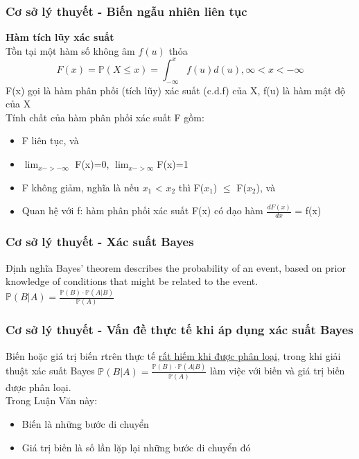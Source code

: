 \documentclass[t]{beamer}
\begin{document}
\begin{frame}[t]
\frametitle{Cơ sở lý thuyết - Biến ngẫu nhiên liên tục}
\textbf{Hàm tích lũy xác suất}\\
Tồn tại một hàm số không âm $f(u)$ thỏa
\[
F(x) = \mathbb{P}(X \leq x) = \int_{-\infty}^{x} f(u)d(u), \infty < x < -\infty 
\]
F(x) gọi là hàm phân phối (tích lũy) xác suất (c.d.f) của X, f(u) là hàm mật độ của X\\
Tính chất của hàm phân phối xác suất F gồm:
\begin{itemize}
\item F liên tục, và
\item $\lim_{x->-\infty}$ F(x)=0, $\lim_{x->\infty}$F(x)=1
\item F không giảm, nghĩa là nếu $x_1$ < $x_2$ thì F($x_1$) $\leq$ F($x_2$), và
\item Quan hệ với f: hàm phân phối xác suất F(x) có đạo hàm $\frac{dF(x)}{dx}$ = f(x)     
\end{itemize}
\end{frame}


\begin{frame}[t]
\frametitle{Cơ sở lý thuyết - Xác suất Bayes}
\begin{block}{Định nghĩa}
Bayes’ theorem describes the probability of an event, based on prior knowledge of conditions that might be related to the event.\\
\center
$\mathbb{P}(B|A) = \frac{\mathbb{P}(B) \cdot \mathbb{P}(A|B)}{\mathbb{P}(A)}$
\end{block}
\end{frame}


\begin{frame}[t]
\frametitle{Cơ sở lý thuyết - Vấn đề thực tế khi áp dụng xác suất Bayes}
Biến hoặc giá trị biến rtrên thực tế \underline{rất hiếm khi được phân loại}, trong khi giải thuật xác suất Bayes $\mathbb{P}(B|A) = \frac{\mathbb{P}(B) \cdot \mathbb{P}(A|B)}{\mathbb{P}(A)}$ làm việc với biến và giá trị biến được phân loại.\\
Trong Luận Văn này:
\begin{itemize}
\item Biến là những bước di chuyển
\item Giá trị biến là số lần lặp lại những bước di chuyển đó
\end{itemize}
\end{frame}
\end{document}
